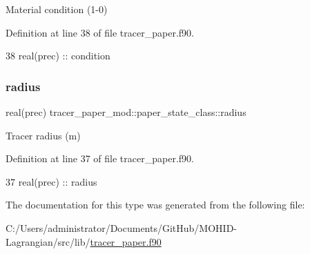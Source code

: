 Material condition (1-\/0) 



Definition at line 38 of file tracer\+\_\+paper.\+f90.


\begin{DoxyCode}
38         \textcolor{keywordtype}{real(prec)} :: condition
\end{DoxyCode}
\mbox{\label{structtracer__paper__mod_1_1paper__state__class_ac70463dad7537b4e18c6719e975a2a80}} 
\subsubsection{\texorpdfstring{radius}{radius}}
{\footnotesize\ttfamily real(prec) tracer\+\_\+paper\+\_\+mod\+::paper\+\_\+state\+\_\+class\+::radius\hspace{0.3cm}{\ttfamily [private]}}



Tracer radius (m) 



Definition at line 37 of file tracer\+\_\+paper.\+f90.


\begin{DoxyCode}
37         \textcolor{keywordtype}{real(prec)} :: radius
\end{DoxyCode}


The documentation for this type was generated from the following file\+:\begin{DoxyCompactItemize}
\item 
C\+:/\+Users/administrator/\+Documents/\+Git\+Hub/\+M\+O\+H\+I\+D-\/\+Lagrangian/src/lib/\mbox{\hyperlink{tracer__paper_8f90}{tracer\+\_\+paper.\+f90}}\end{DoxyCompactItemize}
